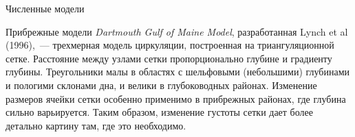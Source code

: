 \begin{chapter}{Численные модели}
\begin{section}{Прибрежные модели}
\emph{Dartmouth Gulf of Maine Model}, разработанная Lynch et al
(1996),~--- трехмерная модель циркуляции, построенная на
триангуляционной сетке. Расстояние между узлами сетки пропорционально
глубине и градиенту глубины. Треугольники малы в областях с шельфовыми
(небольшими) глубинами и пологими склонами дна, и велики в
глубоководных районах. Изменение размеров ячейки сетки особенно
применимо в прибрежных районах, где глубина сильно варьируется. Таким
образом, изменение густоты сетки дает более детально картину там, где
это необходимо.
%


\end{section}
\end{chapter}
